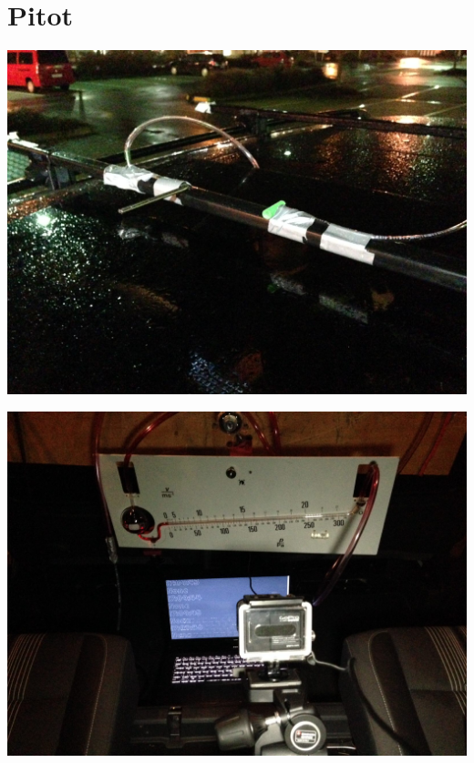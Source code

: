\documentclass[11pt]{beamer}
\begin{document}
\section{Pitot}
\begin{frame}
	\includegraphics[width=\textwidth]{images/3/IMG_0004}
\end{frame}

\begin{frame}
	\includegraphics[width=\textwidth]{images/3/IMG_0007}
\end{frame}
\end{document}
